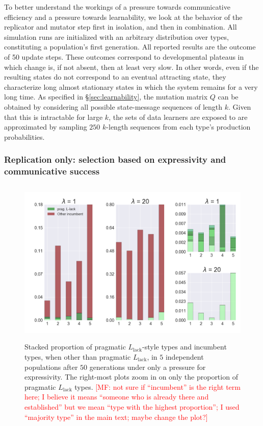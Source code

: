 \documentclass[a4paper, 11pt]{article}
\theoremstyle{Satz}
\newcommand{\mf}[1]{\textcolor{Red}{[MF: #1]}}
\newcommand{\mylang}[1]{\ensuremath{L_{\text{#1}}}\xspace} %
\newcommand{\Llack}{\mylang{lack}}
\begin{document}
To better understand the workings of a pressure towards communicative efficiency and a pressure
towards learnability, we look at the behavior of the replicator and mutator step first in
isolation, and then in combination. All simulation runs are initialized with an arbitrary
distribution over types, constituting a population's first generation. All reported results are
the outcome of 50 update steps. These outcomes correspond to developmental plateaus in which
change is, if not absent, then at least very slow. In other words, even if the resulting states
do not correspond to an eventual attracting state, they characterize long almost stationary
states in which the system remains for a very long time. As specified in
\S\ref{sec:learnability}, the mutation matrix $Q$ can be obtained by considering all possible
state-message sequences of length $k$. Given that this is intractable for large $k$, the sets
of data learners are exposed to are approximated by sampling $250$ $k$-length sequences from
each type's production probabilities.


\subsubsection{Replication only: selection based on expressivity and communicative success} 


\begin{figure}[t]
\centering
\includegraphics[width=\textwidth,height=8cm, keepaspectratio]{./plots/fig1-onlyr}
\caption{Stacked proportion of pragmatic $\Llack$-style types and incumbent types, when other
  than pragmatic $\Llack$, in $5$ independent populations after $50$ generations under only a
  pressure for expressivity. The right-most plots zoom in on only the proportion of pragmatic
  $\Llack$ types. \mf{not sure if ``incumbent'' is the right term here; I believe it means
    ``someone who is already there and established'' but we mean ``type with the highest
    proportion''; I used ``majority type'' in the main text; maybe change the plot?}}
\label{fig:only-R}
\end{figure}
\end{document}

